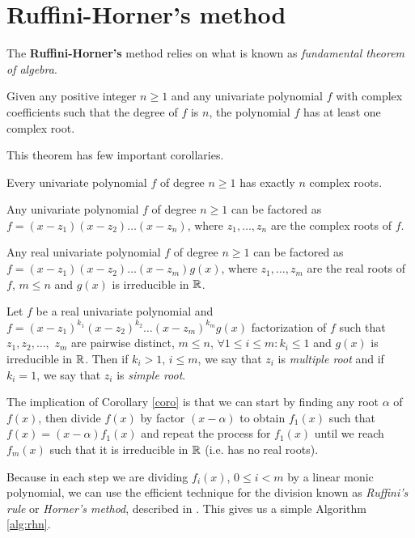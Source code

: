 \documentclass[
  digital, %
  notable,   %
  nolof,     %
  nolot,     %
	final, %
]{fithesis3}
\begin{document}
\section{Ruffini-Horner's method}
The \textbf{Ruffini-Horner's} method relies on what is known as \textit{fundamental theorem of algebra}.
\begin{theorem}
Given any positive integer $n \geq 1$ and any univariate polynomial $f$ with complex coefficients such that the degree of $f$ is $n$, the polynomial $f$ has at least one complex root.
\end{theorem}

This theorem has few important corollaries.
\begin{corollary}
Every univariate polynomial $f$ of degree $n \geq 1$ has exactly $n$ complex roots.
\end{corollary}
\begin{corollary}
Any univariate polynomial $f$ of degree $n \geq 1$ can be factored as $f=(x-z_{1})(x-z_{2})\ldots(x-z_{n})$, where $z_{1},\ldots,$$ z_{n}$ are the complex roots of $f$.
\end{corollary}
\begin{corollary}
\label{coro}
Any real univariate polynomial $f$ of degree $n \geq 1$ can be factored as $f=(x-z_{1})(x-z_{2})\ldots(x-z_{m})g(x)$, where $z_{1},\ldots,z_{m}$ are the real roots of $f$, $m\leq n$ and $g(x)$ is irreducible in $\mathbb{R}$.
\end{corollary}
\begin{definition}
Let $f$ be a real univariate polynomial and $f=(x-z_{1})^{k_{1}}(x-z_{2})^{k_{2}}\ldots(x-z_{m})^{k_{m}}g(x)$ factorization of $f$ such that $z_{1}, z_{2},\ldots,$ $z_{m}$ are pairwise distinct, $m\leq n$, $\forall 1\leq{i}\leq{m}: k_{i}\leq{1}$ and $g(x)$ is irreducible in $\mathbb{R}$. Then if $k_{i} > 1$, $i \leq m$, we say that $z_{i}$ is \emph{multiple root} and if $k_{i} = 1$, we say that $z_{i}$ is \emph{simple root}.
\end{definition}
The implication of Corollary \ref{coro} is that we can start by finding any root $\alpha$ of $f(x)$, then divide $f(x)$ by factor $(x-\alpha)$ to obtain $f_{1}(x)$ such that $f(x)=(x-\alpha)f_{1}(x)$ and repeat the process for $f_{1}(x)$ until we reach $f_{m}(x)$ such that it is irreducible in $\mathbb{R}$ (i.e. has no real roots).

Because in each step we are dividing $f_{i}(x)$, $0 \leq i < m$ by a linear monic polynomial, we can use the efficient technique for the division known as \textit{Ruffini's rule} or \textit{Horner's method}, described in \parencite{horner}. This gives us a simple Algorithm \ref{alg:rhn}.
\end{document}
